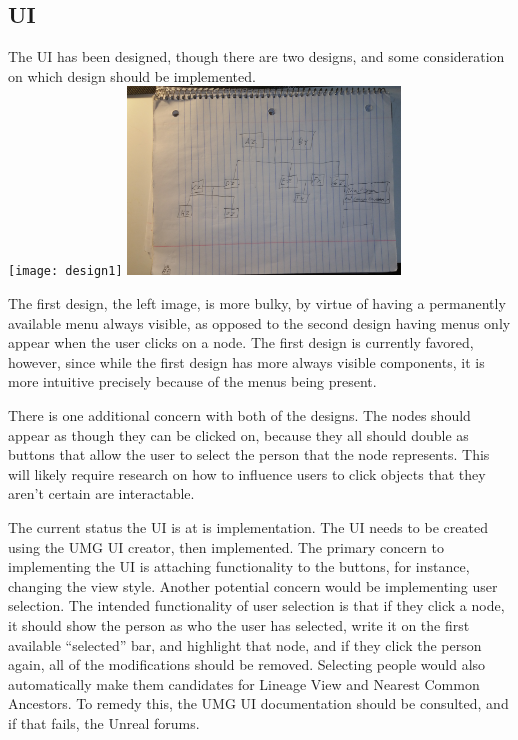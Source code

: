 \documentclass[onecolumn, draftclsnofoot, 10pt, compsoc]{IEEEtran}
\begin{document}
\subsection{UI}
\begin{singlespace}
The UI has been designed, though there are two designs, and some consideration on which design should be implemented.\\
\newline
\texttt{[image: design1]}
\includegraphics[height=5cm]{design2}
\newline

The first design, the left image, is more bulky, by virtue of having a permanently available menu always visible, as opposed to the second design having menus only appear when the user clicks on a node. The first design is currently favored, however, since while the first design has more always visible components, it is more intuitive precisely because of the menus being present. 


There is one additional concern with both of the designs. The nodes should appear as though they can be clicked on, because they all should double as buttons that allow the user to select the person that the node represents. This will likely require research on how to influence users to click objects that they aren't certain are interactable.

The current status the UI is at is implementation. The UI needs to be created using the UMG UI creator, then implemented. The primary concern to implementing the UI is attaching functionality to the buttons, for instance, changing the view style. Another potential concern would be implementing user selection. The intended functionality of user selection is that if they click a node, it should show the person as who the user has selected, write it on the first available “selected” bar, and highlight that node, and if they click the person again, all of the modifications should be removed. Selecting people would also automatically make them candidates for Lineage View and Nearest Common Ancestors. To remedy this, the UMG UI documentation should be consulted, and if that fails, the Unreal forums.
\end{singlespace}
\end{document}
